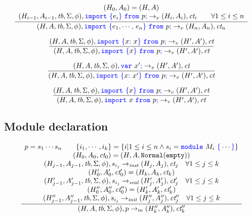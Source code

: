 \documentclass[a4paper]{article}
\newcommand{\code}[1]{\textcolor{blue}{\tt #1}}
\newcommand{\tb}{\emph{tb}}
\newcommand{\ct}{\emph{ct}}
\newcommand{\Normal}{{\tt{Normal}}}
\newcommand{\Empty}{{\tt{empty}}}
\begin{document}
\begin{equation*}
\frac{
    \begin{array}{c}
    (H_0, A_0) = (H, A) \\
    (H_{i-1}, A_{i-1}, \tb, \Sigma, \phi), \code{import}\ \code{\{}e_i\code{\}}\ \code{from}\ p\code{;} \rightarrow_v (H_i, A_i), \ct_i \qquad \forall 1 \le i \le n
    \end{array}
}{
    (H, A, \tb, \Sigma, \phi), \code{import}\ \code{\{}e_1\code{,} \cdots \code{,}\ e_n\code{\}}\ \code{from}\ p\code{;} \rightarrow_v (H_n, A_n), \ct_n
}
\end{equation*}

\begin{equation*}
\frac{
    (H, A, \tb, \Sigma, \phi), \code{import}\ \code{\{}x\code{:}\ x\code{\}}\ \code{from}\ p\code{;} \rightarrow_v (H', A'), \ct
}{
    (H, A, \tb, \Sigma, \phi), \code{import}\ \code{\{}x\code{\}}\ \code{from}\ p\code{;} \rightarrow_v (H', A'), \ct
}
\end{equation*}

\begin{equation*}
\frac{
    (H, A, \tb, \Sigma, \phi), \code{var}\ x'\code{;} \rightarrow_v (H', A'), \ct
}{
    (H, A, \tb, \Sigma, \phi), \code{import}\ \code{\{}x\code{:}\ x'\code{\}}\ \code{from}\ p\code{;} \rightarrow_v (H', A'), \ct
}
\end{equation*}

\begin{equation*}
\frac{
    (H, A, \tb, \Sigma, \phi), \code{import}\ \code{\{}x\code{\}}\ \code{from}\ p\code{;} \rightarrow_v (H', A'), \ct
}{
    (H, A, \tb, \Sigma, \phi), \code{import}\ x\ \code{from}\ p\code{;} \rightarrow_v (H', A'), \ct
}
\end{equation*}

\subsection{Module declaration}

\begin{equation*}
\frac{
    \begin{array}{c}
    p = s_1 \cdots s_n \qquad \{ i_1, \cdots, i_k \} = \{ i | 1 \le i \le n \wedge s_i = \code{module}\ M_i\ \code{\{} \cdots \code{\}} \} \\
    (H_0, A_0, \ct_0) = (H, A, \Normal(\Empty)) \\
    (H_{j-1}, A_{j-1}, \tb, \Sigma, \phi), s_{i_j} \rightarrow_\emph{inst} (H_j, A_j), \ct_j \quad \forall 1 \le j \le k \\
    (H'_0, A'_0, \ct'_0) = (H_k, A_k, \ct_k) \\
    (H'_{j-1}, A'_{j-1}, \tb, \Sigma, \phi), s_{i_j} \rightarrow_\emph{seal} (H'_j, A'_j), \ct'_j \quad \forall 1 \le j \le k \\
    (H''_0, A''_0, \ct''_0) = (H'_k, A'_k, \ct'_k) \\
    (H''_{j-1}, A''_{j-1}, \tb, \Sigma, \phi), s_{i_j} \rightarrow_\emph{init} (H''_j, A''_j), \ct''_j \quad \forall 1 \le j \le k \\
    \end{array}
}{
    (H, A, \tb, \Sigma, \phi), p \rightarrow_m (H''_k, A''_k), \ct''_k
}
\end{equation*}
\end{document}
